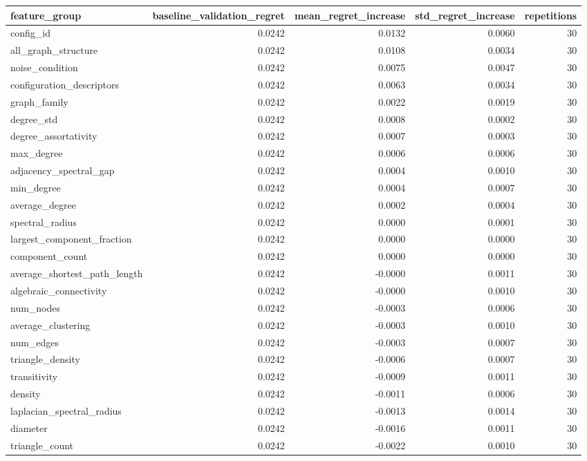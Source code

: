 \begin{tabular}{lrrrr}
\toprule
feature_group & baseline_validation_regret & mean_regret_increase & std_regret_increase & repetitions \\
\midrule
config_id & 0.0242 & 0.0132 & 0.0060 & 30 \\
all_graph_structure & 0.0242 & 0.0108 & 0.0034 & 30 \\
noise_condition & 0.0242 & 0.0075 & 0.0047 & 30 \\
configuration_descriptors & 0.0242 & 0.0063 & 0.0034 & 30 \\
graph_family & 0.0242 & 0.0022 & 0.0019 & 30 \\
degree_std & 0.0242 & 0.0008 & 0.0002 & 30 \\
degree_assortativity & 0.0242 & 0.0007 & 0.0003 & 30 \\
max_degree & 0.0242 & 0.0006 & 0.0006 & 30 \\
adjacency_spectral_gap & 0.0242 & 0.0004 & 0.0010 & 30 \\
min_degree & 0.0242 & 0.0004 & 0.0007 & 30 \\
average_degree & 0.0242 & 0.0002 & 0.0004 & 30 \\
spectral_radius & 0.0242 & 0.0000 & 0.0001 & 30 \\
largest_component_fraction & 0.0242 & 0.0000 & 0.0000 & 30 \\
component_count & 0.0242 & 0.0000 & 0.0000 & 30 \\
average_shortest_path_length & 0.0242 & -0.0000 & 0.0011 & 30 \\
algebraic_connectivity & 0.0242 & -0.0000 & 0.0010 & 30 \\
num_nodes & 0.0242 & -0.0003 & 0.0006 & 30 \\
average_clustering & 0.0242 & -0.0003 & 0.0010 & 30 \\
num_edges & 0.0242 & -0.0003 & 0.0007 & 30 \\
triangle_density & 0.0242 & -0.0006 & 0.0007 & 30 \\
transitivity & 0.0242 & -0.0009 & 0.0011 & 30 \\
density & 0.0242 & -0.0011 & 0.0006 & 30 \\
laplacian_spectral_radius & 0.0242 & -0.0013 & 0.0014 & 30 \\
diameter & 0.0242 & -0.0016 & 0.0011 & 30 \\
triangle_count & 0.0242 & -0.0022 & 0.0010 & 30 \\
\bottomrule
\end{tabular}
